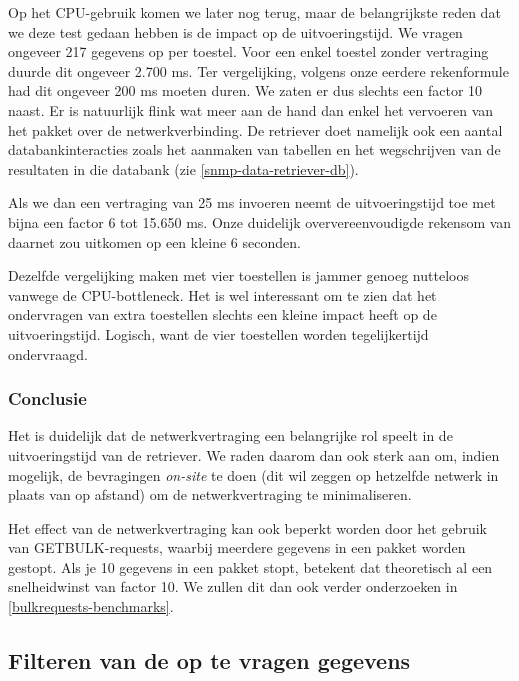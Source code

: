 Op het CPU-gebruik komen we later nog terug, maar de belangrijkste reden dat we deze test gedaan hebben is de impact op de uitvoeringstijd.
We vragen ongeveer 217 gegevens op per toestel.
Voor een enkel toestel zonder vertraging duurde dit ongeveer 2.700 ms.
Ter vergelijking, volgens onze eerdere rekenformule had dit ongeveer 200 ms moeten duren.
We zaten er dus slechts een factor 10 naast.
Er is natuurlijk flink wat meer aan de hand dan enkel het vervoeren van het pakket over de netwerkverbinding.
De retriever doet namelijk ook een aantal databankinteracties zoals het aanmaken van tabellen en
het wegschrijven van de resultaten in die databank (zie \cref{snmp-data-retriever-db}).

Als we dan een vertraging van 25 ms invoeren neemt de uitvoeringstijd toe met bijna een factor 6 tot 15.650 ms.
Onze duidelijk oververeenvoudigde rekensom van daarnet zou uitkomen op een kleine 6 seconden.

Dezelfde vergelijking maken met vier toestellen is jammer genoeg nutteloos vanwege de CPU-bottleneck.
Het is wel interessant om te zien dat het ondervragen van extra toestellen slechts een kleine impact heeft op de uitvoeringstijd.
Logisch, want de vier toestellen worden tegelijkertijd ondervraagd.


\subsubsection{Conclusie}

Het is duidelijk dat de netwerkvertraging een belangrijke rol speelt in de uitvoeringstijd van de retriever.
We raden daarom dan ook sterk aan om, indien mogelijk, de bevragingen \textit{on-site} te doen
(dit wil zeggen op hetzelfde netwerk in plaats van op afstand) om de netwerkvertraging te minimaliseren.

Het effect van de netwerkvertraging kan ook beperkt worden door het gebruik van GETBULK-requests,
waarbij meerdere gegevens in een pakket worden gestopt.
Als je 10 gegevens in een pakket stopt, betekent dat theoretisch al een snelheidwinst van factor 10.
We zullen dit dan ook verder onderzoeken in \cref{bulkrequests-benchmarks}.




\subsection{Filteren van de op te vragen gegevens}
\label{fracties}

